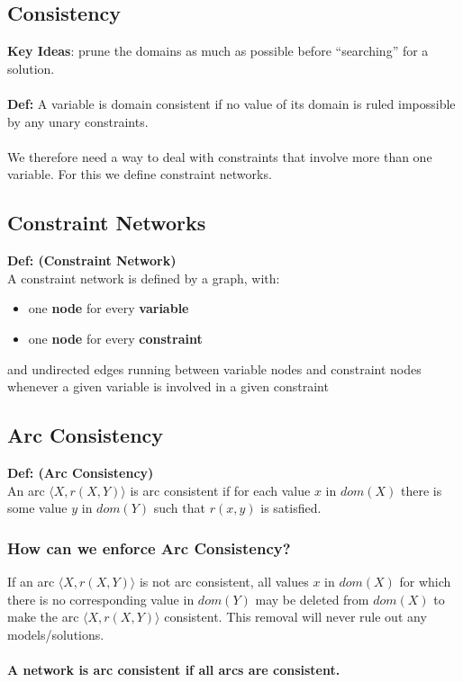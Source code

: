 \documentclass{article}
\def\blu#1{{\color{blu}#1}}
\theoremstyle{definition}
\begin{document}
\subsection*{Consistency}
\textbf{Key Ideas}: prune the domains as much as possible before “searching” for a solution. \\ \\
\textbf{Def:} A variable is domain consistent if no value of its domain is ruled impossible by any unary constraints. \\ \\
We therefore need a way to deal with constraints that involve more than one variable. For this we define constraint networks. 

\subsection*{Constraint Networks}
\textbf{Def: (Constraint Network)} \\
A \blu{constraint network} is defined by a graph, with:
\begin{itemize}
	\item one \textbf{node} for every \textbf{variable}
	\item one \textbf{node} for every \textbf{constraint}
\end{itemize}
and undirected edges running between variable nodes and constraint nodes whenever a given variable is involved in a given constraint

\subsection*{Arc Consistency}
\textbf{Def: (Arc Consistency)} \\
An arc $ \langle X,r(X,Y) \rangle $ is arc consistent if for each value $ x $ in $ dom(X) $ there is some value $ y $ in $ dom(Y ) $ such that $ r(x, y) $ is satisfied.


\subsubsection*{How can we enforce Arc Consistency?}
If an arc $ \langle X,r(X,Y) \rangle $ is not arc consistent, all values $ x $ in $ dom(X) $ for which there is no corresponding value in $ dom(Y ) $ may be deleted from $ dom(X ) $ to make the arc $ \langle X,r(X,Y) \rangle $ consistent. This removal will never rule out any models/solutions.  \\ \\
\textbf{A network is arc consistent if all arcs are consistent. }
\end{document}
